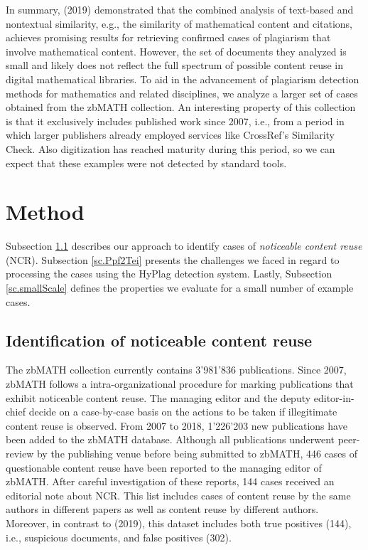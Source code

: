 \documentclass{llncs}
\begin{document}
In summary, \citeauthor{Meuschke2019} (2019) demonstrated that the combined analysis of text-based and nontextual similarity, e.g., the similarity of mathematical content and citations, achieves promising results for retrieving confirmed cases of plagiarism that involve mathematical content. However, the set of documents they analyzed is small and likely does not reflect the full spectrum of possible content reuse in digital mathematical libraries. To aid in the advancement of plagiarism detection methods for mathematics and related disciplines, we analyze a larger set of cases obtained from the zbMATH collection. An interesting property of this collection is that it exclusively includes published work since 2007, i.e., from a period in which larger publishers already employed services like CrossRef's Similarity Check. Also digitization has reached maturity during this period, so we can expect that these examples were not detected by standard tools.

\section{Method}\label{sec.approach}
Subsection \ref{sc.reusefilter} describes our approach to identify cases of \emph{noticeable content reuse} (NCR).
Subsection \ref{sc.Ppf2Tei} presents the challenges we faced in regard to processing the cases using the HyPlag detection system.
Lastly, Subsection \ref{sc.smallScale} defines the properties we evaluate for a small number of example cases.

\subsection{Identification of noticeable content reuse}\label{sc.reusefilter}
The zbMATH collection currently contains 3'981'836 publications. Since 2007, zbMATH follows a intra-organizational procedure for marking publications that exhibit noticeable content reuse. The managing editor and the deputy editor-in-chief decide on a case-by-case basis on the actions to be taken if illegitimate content reuse is observed.
From 2007 to 2018, 1'226'203 new publications have been added to the zbMATH database.
Although all publications underwent peer-review by the publishing venue before being submitted to zbMATH, 446 cases of questionable content reuse have been reported to the managing editor of zbMATH. After careful investigation of these reports, 144 cases received an editorial note about NCR. This list includes cases of content reuse by the same authors in different papers as well as content reuse by different authors. Moreover, in contrast to \citeauthor{Meuschke2019} (2019), this dataset includes both true positives (144), i.e., suspicious documents, and false positives (302).
\end{document}
